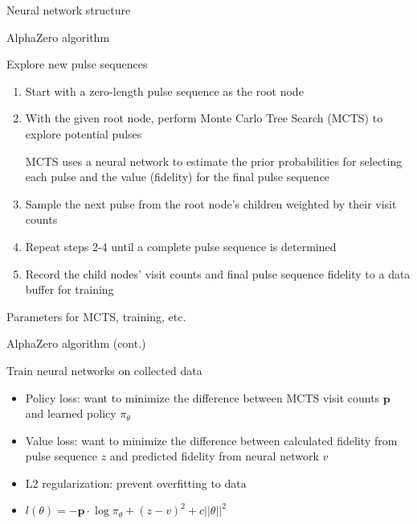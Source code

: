 \documentclass{beamer}
\begin{document}
\begin{frame}{Neural network structure}

\begin{figure}
\centering
\scalebox{.6}{

}
\end{figure}

\end{frame}

\begin{frame}{AlphaZero algorithm}


Explore new pulse sequences

\begin{enumerate}

\item
Start with a zero-length pulse sequence as the root node
\item
With the given root node, perform Monte Carlo Tree Search (MCTS) to
explore potential pulses

MCTS uses a neural network to estimate the prior probabilities for
selecting each pulse and the value (fidelity) for the final pulse
sequence

\item
Sample the next pulse from the root node's children weighted by
their visit counts
\item
Repeat steps 2-4 until a complete pulse sequence is determined
\item
Record the child nodes' visit counts and final pulse sequence
fidelity to a data buffer for training
\end{enumerate}

Parameters for MCTS, training, etc.
\end{frame}

\begin{frame}{AlphaZero algorithm (cont.)}

Train neural networks on collected data

\begin{itemize}

\item
Policy loss: want to minimize the difference between MCTS visit
counts \(\mathbf{p}\) and learned policy \(\pi_\theta\)
\item
Value loss: want to minimize the difference between calculated
fidelity from pulse sequence \(z\) and predicted fidelity from
neural network \(v\)
\item
L2 regularization: prevent overfitting to data
\item
\(l(\theta) = -\mathbf{p} \cdot \log\pi_\theta + (z - v)^2 + c||\theta||^2\)
\end{itemize}
\end{frame}
\end{document}

